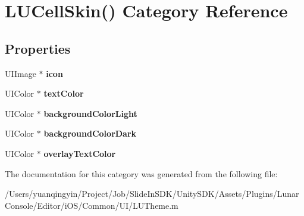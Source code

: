 \hypertarget{category_l_u_cell_skin_07_08}{}\section{L\+U\+Cell\+Skin() Category Reference}
\label{category_l_u_cell_skin_07_08}
\subsection*{Properties}
\begin{DoxyCompactItemize}
\item 
\mbox{\label{category_l_u_cell_skin_07_08_a49827905daefe6588fc6d219dfc5631e}} 
U\+I\+Image $\ast$ {\bfseries icon}
\item 
\mbox{\label{category_l_u_cell_skin_07_08_a994d03e9877948e2dcf44d50989146ae}} 
U\+I\+Color $\ast$ {\bfseries text\+Color}
\item 
\mbox{\label{category_l_u_cell_skin_07_08_a75ff787a4a50bdbad8f477aa20868078}} 
U\+I\+Color $\ast$ {\bfseries background\+Color\+Light}
\item 
\mbox{\label{category_l_u_cell_skin_07_08_a43e3796f419b7ddbde065406f10f8e02}} 
U\+I\+Color $\ast$ {\bfseries background\+Color\+Dark}
\item 
\mbox{\label{category_l_u_cell_skin_07_08_a2d779e845cd07f9afd1662ded0e58ec8}} 
U\+I\+Color $\ast$ {\bfseries overlay\+Text\+Color}
\end{DoxyCompactItemize}


The documentation for this category was generated from the following file\+:\begin{DoxyCompactItemize}
\item 
/\+Users/yuanqingyin/\+Project/\+Job/\+Slide\+In\+S\+D\+K/\+Unity\+S\+D\+K/\+Assets/\+Plugins/\+Lunar\+Console/\+Editor/i\+O\+S/\+Common/\+U\+I/L\+U\+Theme.\+m\end{DoxyCompactItemize}
